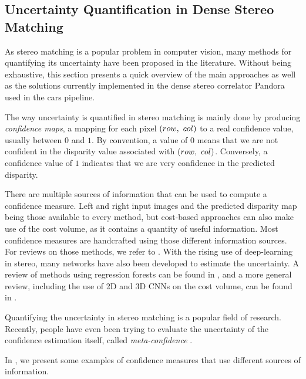\subsection{Uncertainty Quantification in Dense Stereo Matching}\label{sec:uncertainty_pandora}
As stereo matching is a popular problem in computer vision, many methods for quantifying its uncertainty have been proposed in the literature. Without being exhaustive, this section presents a quick overview of the main approaches as well as the solutions currently implemented in the dense stereo correlator Pandora used in the \acrshort{cars} pipeline.

The way uncertainty is quantified in stereo matching is mainly done by producing \textit{confidence maps}, \ie a mapping for each pixel $(row, ~col)$ to a real confidence value, usually between $0$ and $1$. By convention, a value of $0$ means that we are not confident in the disparity value associated with $(row, ~col)$. Conversely, a confidence value of $1$ indicates that we are very confidence in the predicted disparity.

There are multiple sources of information that can be used to compute a confidence measure. Left and right input images and the predicted disparity map being those available to every method, but cost-based approaches can also make use of the cost volume, as it contains a quantity of useful information. Most confidence measures are handcrafted using those different information sources. For reviews on those methods, we refer to \cite{egnal_stereo_2004, hu_quantitative_2012, poggi_quantitative_2017}. With the rising use of deep-learning in stereo, many networks have also been developed to estimate the uncertainty. A review of methods using regression forests can be found in \cite{min-gyu_park_leveraging_2015}, and a more general review, including the use of 2D and 3D CNNs on the cost volume, can be found in \cite{poggi_confidence_2021}.

\begin{remark}
     Quantifying the uncertainty in stereo matching is a popular field of research. Recently, people have even been trying to evaluate the uncertainty of the confidence estimation itself, called \textit{meta-confidence} \cite{kim_meta-confidence_2022}.
\end{remark}

In , we present some examples of confidence measures that use different sources of information.

